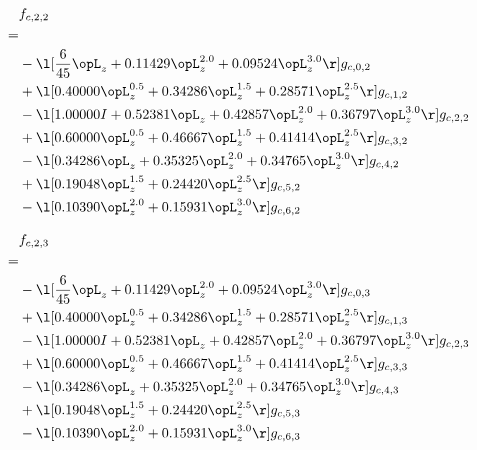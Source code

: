 \begin{alignat}{2} 
\label{eq:f_22_0} 
& f_{c,2,2} \nonumber \\ 
 = \\ 
& - \l[ \frac{6}{45} \opL_z +  0.11429 \opL_z^{2.0} +  0.09524 \opL_z^{3.0}  \r] g_{c,0,2} \nonumber \\ 
& + \l[  0.40000 \opL_z^{0.5} +  0.34286 \opL_z^{1.5} +  0.28571 \opL_z^{2.5}  \r] g_{c,1,2} \nonumber \\ 
& - \l[  1.00000 I +  0.52381 \opL_z +  0.42857 \opL_z^{2.0} +  0.36797 \opL_z^{3.0}  \r] g_{c,2,2} \nonumber \\ 
& + \l[  0.60000 \opL_z^{0.5} +  0.46667 \opL_z^{1.5} +  0.41414 \opL_z^{2.5}  \r] g_{c,3,2} \nonumber \\ 
& - \l[  0.34286 \opL_z +  0.35325 \opL_z^{2.0} +  0.34765 \opL_z^{3.0}  \r] g_{c,4,2} \nonumber \\ 
& + \l[  0.19048 \opL_z^{1.5} +  0.24420 \opL_z^{2.5}  \r] g_{c,5,2} \nonumber \\ 
& - \l[  0.10390 \opL_z^{2.0} +  0.15931 \opL_z^{3.0}  \r] g_{c,6,2} \nonumber \\ 
\end{alignat} 


\begin{alignat}{2} 
\label{eq:f_23_0} 
& f_{c,2,3} \nonumber \\ 
 = \\ 
& - \l[ \frac{6}{45} \opL_z +  0.11429 \opL_z^{2.0} +  0.09524 \opL_z^{3.0}  \r] g_{c,0,3} \nonumber \\ 
& + \l[  0.40000 \opL_z^{0.5} +  0.34286 \opL_z^{1.5} +  0.28571 \opL_z^{2.5}  \r] g_{c,1,3} \nonumber \\ 
& - \l[  1.00000 I +  0.52381 \opL_z +  0.42857 \opL_z^{2.0} +  0.36797 \opL_z^{3.0}  \r] g_{c,2,3} \nonumber \\ 
& + \l[  0.60000 \opL_z^{0.5} +  0.46667 \opL_z^{1.5} +  0.41414 \opL_z^{2.5}  \r] g_{c,3,3} \nonumber \\ 
& - \l[  0.34286 \opL_z +  0.35325 \opL_z^{2.0} +  0.34765 \opL_z^{3.0}  \r] g_{c,4,3} \nonumber \\ 
& + \l[  0.19048 \opL_z^{1.5} +  0.24420 \opL_z^{2.5}  \r] g_{c,5,3} \nonumber \\ 
& - \l[  0.10390 \opL_z^{2.0} +  0.15931 \opL_z^{3.0}  \r] g_{c,6,3} \nonumber \\ 
\end{alignat} 



